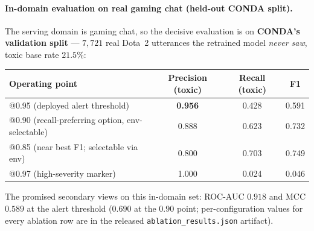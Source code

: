 \documentclass[11pt,a4paper]{article}
\begin{document}
\paragraph{In-domain evaluation on real gaming chat (held-out CONDA split).}
The serving domain is gaming chat, so the decisive evaluation is on \textbf{CONDA's
validation split} --- $7{,}721$ real Dota~2 utterances the retrained model
\emph{never saw}, toxic base rate $21.5\%$:
\begin{center}
\begin{tabular}{lccc}
\toprule
\textbf{Operating point} & \textbf{Precision (toxic)} & \textbf{Recall (toxic)} & \textbf{F1} \\
\midrule
@0.95 (deployed alert threshold) & \textbf{0.956} & 0.428 & 0.591 \\
@0.90 (recall-preferring option, env-selectable) & 0.888 & 0.623 & 0.732 \\
@0.85 (near best F1; selectable via env) & 0.800 & 0.703 & 0.749 \\
@0.97 (high-severity marker) & 1.000 & 0.024 & 0.046 \\
\bottomrule
\end{tabular}
\end{center}
The promised secondary views on this in-domain set: ROC-AUC $0.918$ and MCC $0.589$
at the alert threshold ($0.690$ at the $0.90$ point; per-configuration values for
every ablation row are in the released \texttt{ablation\_results.json} artifact).
\end{document}
